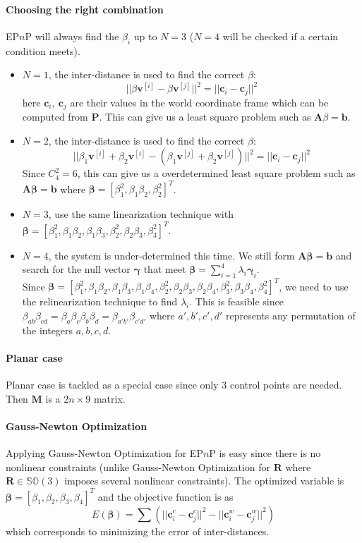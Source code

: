 \documentclass[a4paper]{report}
\begin{document}
\paragraph{Choosing the right combination}
EP$n$P will always find the $\beta_i$ up to $N=3$ ($N=4$ will be checked if a certain condition meets). 
\begin{itemize}
\item $N=1$, the inter-distance is used to find the correct $\beta$:
$$
||\beta\mathbf{v}^{[i]}-\beta\mathbf{v}^{[j]}||^2=||\mathbf{c}_i-\mathbf{c}_j||^2
$$
here $\mathbf{c}_i,\ \mathbf{c}_j$ are their values in the world coordinate frame which can be computed from $\mathbf{P}$. This can give us a least square problem such as $\mathbf{A}\beta=\mathbf{b}$.
\item $N=2$, the inter-distance is used to find the correct $\beta$:
$$
||\beta_1\mathbf{v}^{[i]}+\beta_2\mathbf{v}^{[i]}-(\beta_1\mathbf{v}^{[j]}+\beta_2\mathbf{v}^{[j]})||^2=||\mathbf{c}_i-\mathbf{c}_j||^2
$$
Since $C_{4}^{2}=6$, this can give us a overdetermined least square problem such as $\mathbf{A}\bm{\beta}=\mathbf{b}$ where $\bm{\beta}=[\beta_1^2,\beta_1\beta_2,\beta_2^2]^T$.
\item $N=3$, use the same linearization technique with $\bm{\beta}=[\beta_1^2,\beta_1\beta_2,\beta_1\beta_3,\beta_2^2,\beta_2\beta_3,\beta_3^2]^T$. 
\item $N=4$, the system is under-determined this time. We still form $\mathbf{A}\bm{\beta}=\mathbf{b}$ and search for the null vector $\bm{\gamma}$ that meet $\bm{\beta}=\sum_{i=1}^{4}\lambda_i \bm{\gamma}_i$. \\
Since $\bm{\beta}=[\beta_1^2,\beta_1\beta_2,\beta_1\beta_3,\beta_1\beta_4,\beta_2^2,\beta_2\beta_3,\beta_2\beta_4,\beta_3^2,\beta_3\beta_4,\beta_4^2]^T$, we need to use the relinearization technique to find $\lambda_i$. This is feasible since $\beta_{ab}\beta_{cd}=\beta_{a}\beta_{c}\beta_{b}\beta_{d}=\beta_{a'b'}\beta_{c'd'}$ where ${a',b',c',d'}$ represents any permutation of the integers ${a,b,c,d}$.
\end{itemize}

\paragraph{Planar case}
Planar case is tackled as a special case since only $3$ control points are needed. Then $\mathbf{M}$ is a $2n \times 9$ matrix.

\paragraph{Gauss-Newton Optimization}
Applying Gauss-Newton Optimization for EP$n$P is easy since there is no nonlinear constraints (unlike Gauss-Newton Optimization for $\mathbf{R}$ where $\mathbf{R} \in \mathbb{SO}(3)$ imposes several nonlinear constraints). The optimized variable is $\bm{\beta}=[\beta_1,\beta_2, \beta_3, \beta_4]^T$ and the objective function is as 
$$
E(\bm{\beta})=\sum \left( 
||\mathbf{c}^{c}_i-\mathbf{c}^{c}_j||^2-||\mathbf{c}^{w}_i-\mathbf{c}^{w}_j||^2
\right)
$$
which corresponds to minimizing the error of inter-distances.
\end{document}
